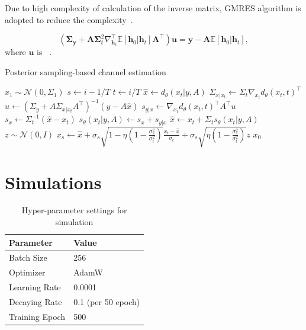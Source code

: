 \documentclass[lettersize,journal]{IEEEtran}
\begin{document}
Due to high complexity of calculation of the inverse matrix, GMRES algorithm is adopted to reduce the complexity~\cite{saadGMRESGeneralizedMinimal1986}.

\begin{equation}
(\boldsymbol{\Sigma}_{\mathbf{y}}+\mathbf{A}\boldsymbol{\Sigma}_{t}^{2}\nabla_{\mathbf{h}_{t}}^{\top}\mathbb{E}[\mathbf{h}_{0}|\mathbf{h}_{t}]\mathbf{A}^{\top})\mathbf{u} = \mathbf{y}- \mathbf{A}\mathbb{E}[\mathbf{h}_{0}|\mathbf{h}_{t}],
\end{equation}
where $\mathbf{u}$ is ~.

\begin{algorithm}[!t]
\caption{Posterior sampling-based channel estimation}
\begin{algorithmic}[1]
  \STATE $x_{1}\sim\mathcal{N}(0, \Sigma_{1})$
    \STATE $s \gets i-1 / T$
    \STATE $t \gets i/T$
    \STATE $\hat{x} \gets d_{\theta}(x_{t}|y,A)$
    \STATE $\Sigma_{x|x_{t}}\gets \Sigma_{t}\nabla_{x_{t}}d_{\theta}(x_{t},t)^{\top}$
    \STATE $u\gets (\Sigma_{y}+A\Sigma_{x|x_{t}}A^{\top})^{-1}(y-A\hat{x})$
    \STATE $s_{y|x}\gets \nabla_{x_{t}}d_{\theta}(x_{t},t)^{\top}A^{\top}u$
    \STATE $s_{x}\gets \Sigma^{-1}_{t}(\hat{x}-x_{t})$
    \STATE $s_{\theta}(x_{t}|y,A) \gets s_{x}+s_{y|x}$
    \STATE $\hat{x}\gets x_{t}+ \Sigma_{t}s_{\theta}(x_{t}|y,A)$
    \STATE $z\sim\mathcal{N}(0,I)$
    \STATE $x_{s}\gets \hat{x}+ \sigma_{s}\sqrt{1- \eta\left(1- \frac{\sigma_{s}^{2}}{\sigma_{t}^{2}}\right)}\frac{x_{t}-\hat{x}}{\sigma_{t}}+ \sigma_{s}\sqrt{\eta(1- \frac{\sigma_{s}^{2}}{\sigma_{t}^{2}})}z$
  \ENDFOR
  \RETURN $x_{0}$
\end{algorithmic}
\end{algorithm}

\section{Simulations}

\begin{table}[!t]
\begin{center}
  \renewcommand{\arraystretch}{1.1} 
\caption{Hyper-parameter settings for simulation\label{tab:table1}}
\label{tab1}
\begin{tabular}{M{0.19\columnwidth}|M{0.3\columnwidth}}
\hline
\textbf{Parameter} & \textbf{Value} \\
\hline
Batch Size & 256 \\
\hline
Optimizer & AdamW \\
\hline
Learning Rate & 0.0001 \\
\hline
Decaying Rate & 0.1 (per 50 epoch) \\
\hline
Training Epoch & 500 \\
\hline
\end{tabular}
\end{center}
\end{table}
\end{document}
